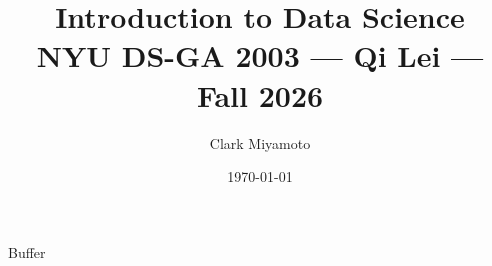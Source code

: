 \documentclass[11pt,fleqn]{article}
\title{Introduction to Data Science \\[0.3em]
       \large NYU DS-GA 2003 --- Qi Lei --- Fall 2026}
\author{Clark Miyamoto}
\date{\today}
\numberwithin{equation}{section}
\theoremstyle{definition}
\theoremstyle{definition}
\begin{document}
\maketitle

\tableofcontents

\newpage


\newpage
Buffer
\end{document}
